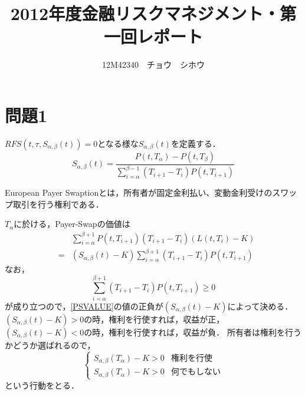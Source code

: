 \documentclass[a4paper,11pt]{jsarticle}
\title{2012年度金融リスクマネジメント・第一回レポート}
\author{12M42340　チョウ　シホウ}
\date{}
\numberwithin{theorem}{section}  %
\numberwithin{equation}{section} %
\begin{document}
{}
\renewcommand{\thepart}{\arabic{part}}

\maketitle

\section{問題1}
$RFS(t,\tau,S_{\alpha,\beta}(t))=0$となる様な$S_{\alpha,\beta}(t)$を定義する．
\begin{equation}
S_{\alpha,\beta}(t) = \frac{P(t,T_{\alpha})-P(t,T_{\beta})}{\sum_{i=\alpha}^{\beta-1} (T_{i+1}-T_{i})P(t,T_{i+1})}
\end{equation}

European Payer Swaptionとは，所有者が固定金利払い、変動金利受けのスワップ取引を行う権利である．

$T_{\alpha}$に於ける，Payer-Swapの価値は
\begin{eqnarray}
&&\sum_{i=\alpha}^{\beta+1} P(t,T_{i+1})(T_{i+1} - T_{i})(L(t,T_i)-K)\\
&=& (S_{\alpha,\beta}(t)-K) \sum_{i=\alpha}^{\beta+1} (T_{i+1} - T_{i})P(t,T_{i+1})\label{PSVALUE}
\end{eqnarray}
なお，
\[
\sum_{i=\alpha}^{\beta+1} (T_{i+1} - T_{i})P(t,T_{i+1}) \ge 0
\]
が成り立つので，\eqref{PSVALUE}の値の正負が$(S_{\alpha,\beta}(t)-K)$によって決める．$(S_{\alpha,\beta}(t)-K)>0$の時，権利を行使すれば，収益が正，$(S_{\alpha,\beta}(t)-K)<0$の時，権利を行使すれば，収益が負．
所有者は権利を行うかどうか選ばれるので，
\[
\begin{cases}
S_{\alpha,\beta}(T_{\alpha}) - K >0 & \text{権利を行使}\\
S_{\alpha,\beta}(T_{\alpha}) - K >0 & \text{何でもしない}
\end{cases}
\]
という行動をとる．
\newpage
\end{document}
